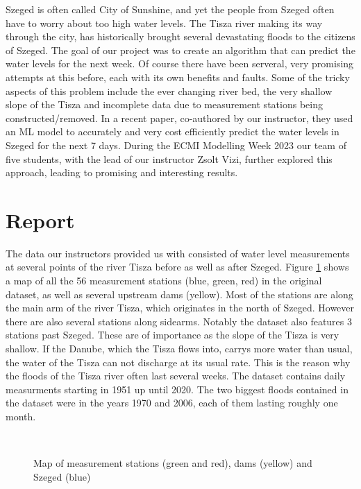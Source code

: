 \documentclass{article}
\begin{document}
Szeged is often called City of Sunshine, and yet the people from Szeged often
have to worry about too high water levels. The Tisza river making its way
through the city, has historically brought several devastating floods to the
citizens of Szeged. The goal of our project was to create an algorithm that
can predict the water levels for the next week. Of course there have been
serveral, very promising attempts at this before, each with its own benefits
and faults. Some of the tricky aspects of this problem include the ever
changing river bed, the very shallow slope of the Tisza and incomplete data
due to measurement stations being constructed/removed. In a recent
paper{\cite{WaterLevel2023}}, co-authored by our instructor, they used an ML
model to accurately and very cost efficiently predict the water levels in
Szeged for the next 7 days. During the ECMI Modelling Week 2023 our team of
five students, with the lead of our instructor Zsolt Vizi, further explored
this approach, leading to promising and interesting results.

\section{Report}

The data our instructors provided us with consisted of water level
measurements at several points of the river Tisza before as well as after
Szeged. Figure \ref{map} shows a map of all the 56 measurement stations (blue,
green, red) in the original dataset, as well as several upstream dams
(yellow). Most of the stations are along the main arm of the river Tisza,
which originates in the north of Szeged. However there are also several
stations along sidearms. Notably the dataset also features 3 stations past
Szeged. These are of importance as the slope of the Tisza is very shallow. If
the Danube, which the Tisza flows into, carrys more water than usual, the
water of the Tisza can not discharge at its usual rate. This is the reason why
the floods of the Tisza river often last several weeks. The dataset contains
daily measurments starting in 1951 up until 2020. The two biggest floods
contained in the dataset were in the years 1970 and 2006, each of them lasting
roughly one month.

\

\begin{figure}[h]
  \caption{Map of measurement stations (green and red), dams (yellow) and
  Szeged (blue)\label{map}}
\end{figure}
\end{document}
